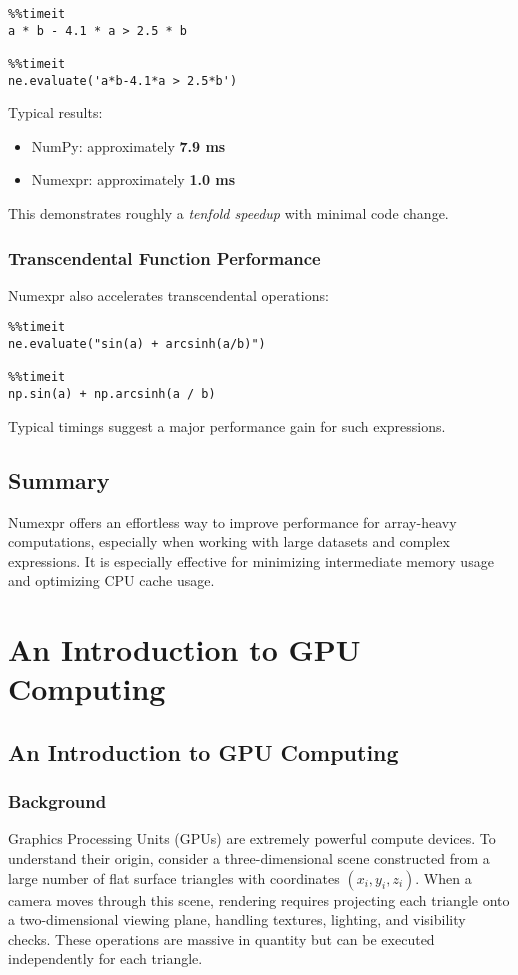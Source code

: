 \documentclass[11pt,a4paper]{book}
\begin{document}
\begin{lstlisting}
%%timeit
a * b - 4.1 * a > 2.5 * b

%%timeit
ne.evaluate('a*b-4.1*a > 2.5*b')
\end{lstlisting}

Typical results:
\begin{itemize}
  \item NumPy: approximately \textbf{7.9 ms}
  \item Numexpr: approximately \textbf{1.0 ms}
\end{itemize}

This demonstrates roughly a \emph{tenfold speedup} with minimal code change.

\subsection*{Transcendental Function Performance}
Numexpr also accelerates transcendental operations:
\begin{lstlisting}
%%timeit
ne.evaluate("sin(a) + arcsinh(a/b)")

%%timeit
np.sin(a) + np.arcsinh(a / b)
\end{lstlisting}

Typical timings suggest a major performance gain for such expressions.

\section*{Summary}
Numexpr offers an effortless way to improve performance for array-heavy computations, especially when working with large datasets and complex expressions. It is especially effective for minimizing intermediate memory usage and optimizing CPU cache usage.

\chapter{An Introduction to GPU Computing}

\section{An Introduction to GPU Computing}

\subsection*{Background}

Graphics Processing Units (GPUs) are extremely powerful compute devices. To understand their origin, consider a three-dimensional scene constructed from a large number of flat surface triangles with coordinates \((x_i, y_i, z_i)\). When a camera moves through this scene, rendering requires projecting each triangle onto a two-dimensional viewing plane, handling textures, lighting, and visibility checks. These operations are massive in quantity but can be executed independently for each triangle.
\end{document}
